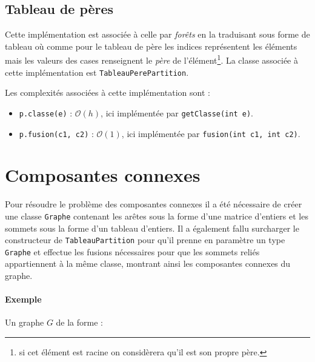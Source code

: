 \documentclass[12pt, a4paper]{report}
\begin{document}
    \subsection{Tableau de pères}

    Cette implémentation est associée à celle par \emph{forêts} en la traduisant sous forme de tableau où comme pour le tableau de père les indices représentent les éléments mais les valeurs des cases renseignent le \emph{père} de l'élément\footnote{si cet élément est racine on considèrera qu'il est son propre père.}. La classe associée à cette implémentation est \texttt{TableauPerePartition}.

    Les complexités associées à cette implémentation sont :
    \begin{itemize}
        \item \texttt{p.classe(e)} : $\mathcal{O}(h)$, ici implémentée par \texttt{getClasse(int e)}.
        \item \texttt{p.fusion(c1, c2)} : $\mathcal{O}(1)$, ici implémentée par \texttt{fusion(int c1, int c2)}.
    \end{itemize}

    \section{Composantes connexes}

    Pour résoudre le problème des composantes connexes il a été nécessaire de créer une classe \texttt{Graphe} contenant les arêtes sous la forme d'une matrice d'entiers et les sommets sous la forme d'un tableau d'entiers. Il a également fallu surcharger le constructeur de \texttt{TableauPartition} pour qu'il prenne en paramètre un type \texttt{Graphe} et effectue les fusions nécessaires pour que les sommets reliés appartiennent à la même classe, montrant ainsi les composantes connexes du graphe.

    \paragraph{Exemple}

    Un graphe $G$ de la forme :

    \begin{figure}[h]
        \centering
    \end{figure}
\end{document}
